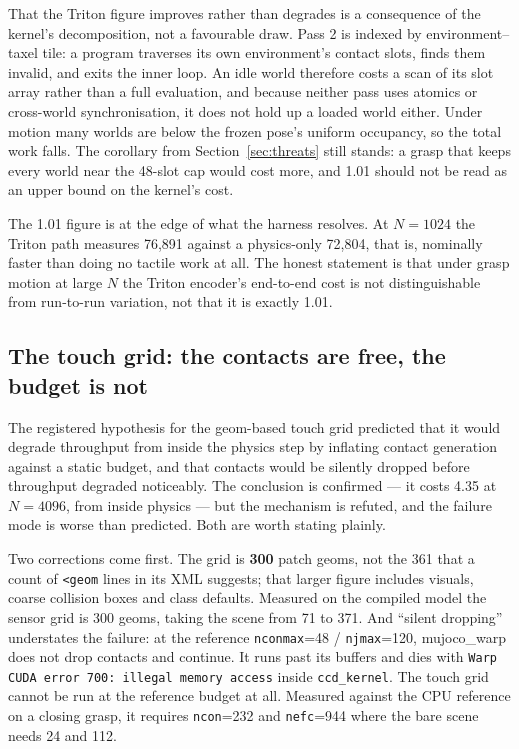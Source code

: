\documentclass[journal]{IEEEtran}
\begin{document}
That the Triton figure improves rather than degrades is a consequence of the kernel's decomposition, not a favourable draw. Pass 2 is indexed by environment--taxel tile: a program traverses its own environment's contact slots, finds them invalid, and exits the inner loop. An idle world therefore costs a scan of its slot array rather than a full evaluation, and because neither pass uses atomics or cross-world synchronisation, it does not hold up a loaded world either. Under motion many worlds are below the frozen pose's uniform occupancy, so the total work falls. The corollary from Section~\ref{sec:threats} still stands: a grasp that keeps every world near the 48-slot cap would cost more, and 1.01 should not be read as an upper bound on the kernel's cost.

The 1.01 figure is at the edge of what the harness resolves. At $N=1024$ the Triton path measures 76,891 against a physics-only 72,804, that is, nominally faster than doing no tactile work at all. The honest statement is that under grasp motion at large $N$ the Triton encoder's end-to-end cost is not distinguishable from run-to-run variation, not that it is exactly 1.01.

\subsection{The touch grid: the contacts are free, the budget is not}
\label{sec:grid}

The registered hypothesis for the geom-based touch grid predicted that it would degrade throughput from inside the physics step by inflating contact generation against a static budget, and that contacts would be silently dropped before throughput degraded noticeably. The conclusion is confirmed --- it costs 4.35 at $N=4096$, from inside physics --- but the mechanism is refuted, and the failure mode is worse than predicted. Both are worth stating plainly.

Two corrections come first. The grid is \textbf{300} patch geoms, not the 361 that a count of \texttt{\textless geom} lines in its XML suggests; that larger figure includes visuals, coarse collision boxes and class defaults. Measured on the compiled model the sensor grid is 300 geoms, taking the scene from 71 to 371. And ``silent dropping'' understates the failure: at the reference \texttt{nconmax}=48 / \texttt{njmax}=120, mujoco\_warp does not drop contacts and continue. It runs past its buffers and dies with \texttt{Warp CUDA error 700: illegal memory access} inside \texttt{ccd\_kernel}. The touch grid cannot be run at the reference budget at all. Measured against the CPU reference on a closing grasp, it requires \texttt{ncon}=232 and \texttt{nefc}=944 where the bare scene needs 24 and 112.
\end{document}
